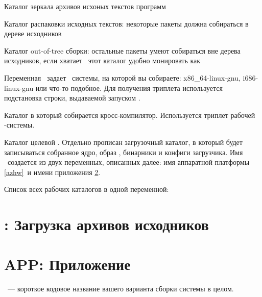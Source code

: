 \bigskip
Каталог зеркала архивов исхоных текстов программ


Каталог распаковки исходных текстов: некоторые пакеты должна собираться в дереве
исходников


Каталог out-of-tree сборки: остальные пакеты умеют собираться вне дерева
исходников, если хватает \ram\ этот каталог удобно монировать как 


Переменная \ задает \ системы, на которой вы
собираете: x86\_64-linux-gnu, i686-linux-gnu или что-то подобное. Для получения
триплета используется подстановка строки, выдаваемой запуском .


Каталог в который собирается кросс-компилятор. Используется триплет
рабочей \linux-системы.


Каталог целевой . Отдельно прописан загрузочный каталог, в который
будет записываться собранное ядро, образ , бинарники и конфиги
загрузчика. Имя \ создается из двух переменных, описанных далее: имя
аппаратной платформы \ref{azhw}\ и имени приложения
\ref{azapp}.


Список всех рабочих каталогов в одной переменной:


\section{: Загрузка архивов исходников} \label{azgz}

\section{APP: Приложение}\label{azapp}

\ --- короткое кодовое название вашего варианта сборки системы
в целом.

